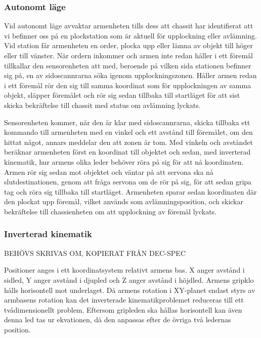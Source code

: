 \subsubsection{Autonomt läge}

Vid autonomt läge avvaktar armenheten tills dess att chassit har identifierat att vi befinner oss på en plockstation som är aktuell för upplockning eller avlämning. Vid station får armenheten en order, plocka upp eller lämna av objekt till höger eller till vänster. När ordern inkommer och armen inte redan håller i ett föremål tillkallar den sensorenheten att med, beroende på vilken sida stationen befinner sig på, en av sidoscannrarna söka igenom upplockningszonen. Håller armen redan i ett föremål rör den sig till samma koordinat som för upplockningen av samma objekt, släpper föremålet och rör sig sedan tillbaka till startläget för att sist skicka bekräftelse till chassit med status om avlämning lyckats.

Sensorenheten kommer, när den är klar med sidoscannrarna, skicka tillbaka ett kommando till armenheten med en vinkel och ett avstånd till föremålet, om den hittat något, annars meddelar den att zonen är tom. Med vinkeln och avståndet beräknar armenheten först en koordinat till objektet och sedan, med inverterad kinematik, hur armens olika leder behöver röra på sig för att nå koordinaten. Armen rör sig sedan mot objektet och väntar på att servona ska nå slutdestinationen, genom att fråga servona om de rör på sig, för att sedan gripa tag och röra sig tillbaka till startläget. Armenheten sparar sedan koordinaten där den plockat upp föremål, vilket används som avlämningsposition, och skickar bekräftelse till chassienheten om att upplockning av föremål lyckats. 

\subsubsection{Inverterad kinematik}
\label{inverskinematik}

BEHÖVS SKRIVAS OM, KOPIERAT FRÅN DEC-SPEC

Positioner anges i ett koordinatsystem relativt armens bas. X anger avstånd i sidled, Y anger avstånd i djupled och Z anger avstånd i höjdled. Armens gripklo hålls horisontell mot underlaget. Då armens rotation i XY-planet endast styrs av armbasens rotation kan det inverterade kinematikproblemet reduceras till ett tvådimensionellt problem. Eftersom gripleden ska hållas horisontell kan även denna led tas ur ekvationen, då den anpassas efter de övriga två ledernas position.

